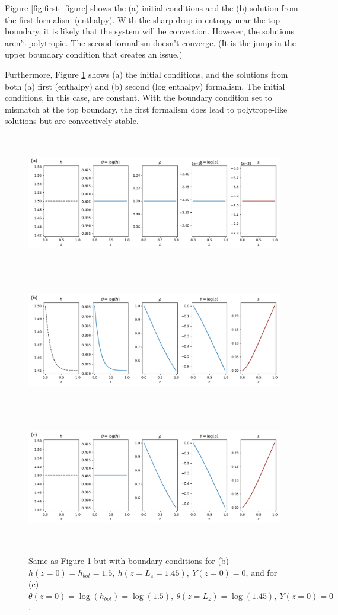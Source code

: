 \documentclass{aastex631}
\begin{document}
Figure \ref{fig:first_figure} shows the (a) initial conditions and the (b) solution from the first formalism (enthalpy). With the sharp drop in entropy near the top boundary, it is likely that the system will be convection. However, the solutions aren't polytropic. The second formalism doesn't converge. (It is the jump in the upper boundary condition that creates an issue.)


Furthermore, Figure \ref{fig:second_figure} shows (a) the initial conditions, and the solutions from both (a) first (enthalpy) and (b) second (log enthalpy) formalism. The initial conditions, in this case, are constant. With the boundary condition set to mismatch at the top boundary, the first formalism does lead to polytrope-like solutions but are convectively stable. 

\begin{figure}
    \centering
    \includegraphics[width=\textwidth,height=6cm]{kramers_initial_condition_linear_ic1_nh0.5_eps-2.22e-16_gamma1.67.pdf}\\
    \includegraphics[width=\textwidth,height=6cm]{kramers_solve_h_linear_ic1_nh0.5_eps-2.22e-16_gamma1.67.pdf}\\
    \includegraphics[width=\textwidth,height=6cm]{kramers_solve_theta_linear_ic1__nh0.5_eps-2.22e-16_gamma1.67.pdf}
    \caption{Same as Figure 1 but with boundary conditions for (b) $h(z=0)=h_{bot}=1.5,~h(z=L_{z}=1.45),~Y(z=0)=0$, and for (c) $\theta(z=0)=\log(h_{bot})=\log(1.5),~\theta(z=L_{z})=\log(1.45),~Y(z=0)=0$.}
    \label{fig:second_figure}
\end{figure}
\end{document}
